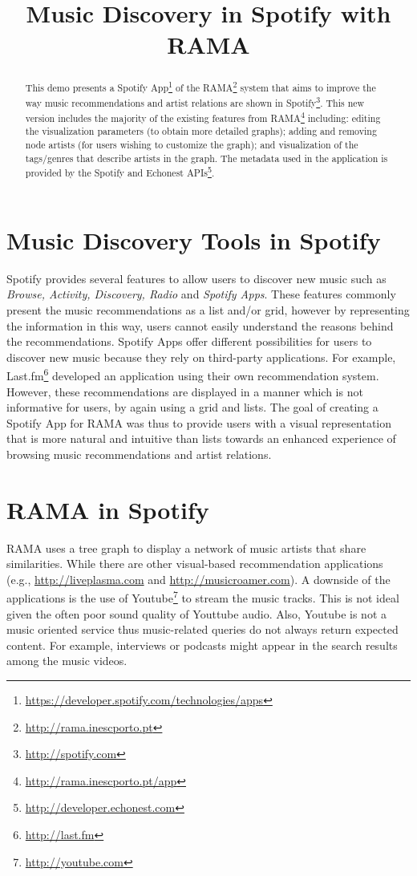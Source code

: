 \documentclass{article}
\title{Music Discovery in Spotify with RAMA}
\begin{document}
\maketitle

\begin{abstract}
  This demo presents a Spotify App\footnote{\url{https://developer.spotify.com/technologies/apps}} of the RAMA\footnote{\url{http://rama.inescporto.pt}} system that aims to improve the way music recommendations and artist relations are shown in Spotify\footnote{\url{http://spotify.com}}.  This new version includes the majority of the existing features from RAMA\footnote{\url{http://rama.inescporto.pt/app}} including: editing the visualization parameters (to obtain more detailed graphs); adding and removing node artists (for users wishing to customize the graph); and visualization of the tags/genres that describe artists in the graph.
  The metadata used in the application is provided by the Spotify and Echonest APIs\footnote{\url{http://developer.echonest.com}}.
\end{abstract}

  \section{Music Discovery Tools in Spotify}
  \label{sec:spotify_tools}

    Spotify provides several features to allow users to discover new music such as \textit{Browse, Activity, Discovery, Radio} and \textit{Spotify Apps}.
    These features commonly present the music recommendations as a list and/or grid, however by representing the information in this way, users cannot easily understand the reasons behind the recommendations. 
    Spotify Apps offer different possibilities for users to discover new music because they rely on third-party applications. For example, Last.fm\footnote{\url{http://last.fm}} developed an application using their own recommendation system.
    However, these recommendations are displayed in a manner which is not informative for users, by again using a grid and lists. 
    The goal of creating a Spotify App for RAMA\cite{Gouyon2011} was thus to provide users with a visual representation that is more natural and intuitive than lists towards an enhanced experience of browsing music recommendations and artist relations. 

  \section{RAMA in Spotify}
  \label{sec:rama}
    \sloppy
    RAMA uses a tree graph to display a network of music artists that share similarities.
    While there are other visual-based recommendation applications (e.g., \url{http://liveplasma.com} and \url{http://musicroamer.com}).
    A downside of the applications is the use of Youtube\footnote{\url{http://youtube.com}} to stream the music tracks.
    This is not ideal given the often poor sound quality of Youttube audio. Also, Youtube is not a music oriented service thus music-related queries do not always return expected content. For example, interviews or podcasts might appear in the search results among the music videos.
\end{document}
